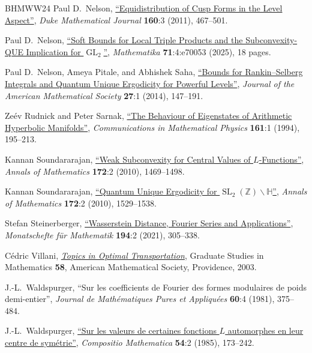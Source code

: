 \documentclass[11pt,a4paper]{amsart}
\newcommand{\Hb}{\mathbb{H}}
\newcommand{\Z}{\mathbb{Z}}
\DeclareMathOperator{\GL}{GL}
\DeclareMathOperator{\SL}{SL}
\numberwithin{equation}{section}
\theoremstyle{remark}
\theoremstyle{definition}
\begin{document}
\begin{thebibliography}{BHMWW24}
 Paul D.~Nelson, \href{https://doi.org/10.1215/00127094-144287}{``Equidistribution of Cusp Forms in the Level Aspect''}, \textit{Duke Mathematical Journal} \textbf{160}:3 (2011), 467--501.

 Paul D.~Nelson, \href{https://doi.org/10.1112/mtk.70053}{``Soft Bounds for Local Triple Products and the Subconvexity-QUE Implication for $\GL_2$''}, \textit{Mathematika} \textbf{71}:4:e70053 (2025), 18 pages.

 Paul D.~Nelson, Ameya Pitale, and Abhishek Saha, \href{https://doi.org/10.1090/S0894-0347-2013-00779-1}{``Bounds for Rankin--Selberg Integrals and Quantum Unique Ergodicity for Powerful Levels''}, \textit{Journal of the American Mathematical Society} \textbf{27}:1 (2014), 147--191.

 Ze\'{e}v Rudnick and Peter Sarnak, \href{https://doi.org/10.1007/BF02099418}{``The Behaviour of Eigenstates of Arithmetic Hyperbolic Manifolds''}, \textit{Communications in Mathematical Physics} \textbf{161}:1 (1994), 195--213.

 Kannan Soundararajan, \href{https://doi.org/10.4007/annals.2010.172.1469}{``Weak Subconvexity for Central Values of $L$-Functions''}, \textit{Annals of Mathematics} \textbf{172}:2 (2010), 1469--1498.

 Kannan Soundararajan, \href{https://doi.org/10.4007/annals.2010.172.1529}{``Quantum Unique Ergodicity for $\SL_2(\Z) \backslash \Hb$''}, \textit{Annals of Mathematics} \textbf{172}:2 (2010), 1529--1538.

 Stefan Steinerberger, \href{https://doi.org/10.1007/s00605-020-01497-2}{``Wasserstein Distance, Fourier Series and Applications''}, \textit{Monatschefte f\"{u}r Mathematik} \textbf{194}:2 (2021), 305--338.

 C\'{e}dric Villani, \href{https://doi.org/10.1090/gsm/058}{\textit{Topics in Optimal Transportation}}, Graduate Studies in Mathematics \textbf{58}, American Mathematical Society, Providence, 2003.

 J.-L.~Waldspurger, ``Sur les coefficients de Fourier des formes modulaires de poids demi-entier'', \textit{Journal de Math\'{e}matiques Pures et Appliqu\'{e}es} \textbf{60}:4 (1981), 375--484.

 J.-L.~Waldspurger, \href{http://www.numdam.org/item/CM_1985__54_2_173_0/}{``Sur les valeurs de certaines fonctions $L$ automorphes en leur centre de sym\'{e}trie''}, \textit{Compositio Mathematica} \textbf{54}:2 (1985), 173--242.


\end{thebibliography}
\end{document}
